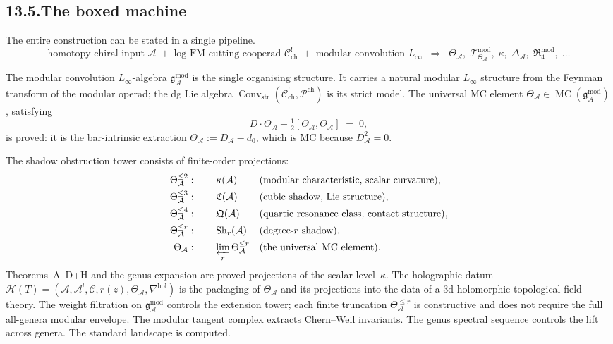 \documentclass[11pt]{report}
\theoremstyle{definition}
\theoremstyle{remark}
\providecommand{\cA}{\mathcal{A}}
\providecommand{\cC}{\mathcal{C}}
\numberwithin{equation}{section}
\begin{document}
\subsection*{13.5.\enspace The boxed machine}

The entire construction can be stated in a single pipeline.
\[
\boxed{
\text{homotopy chiral input }\cA
\;+\;
\text{log-FM cutting cooperad }\mathcal C^!_{\mathrm{ch}}
\;+\;
\text{modular convolution }L_\infty
\;\;\Longrightarrow\;\;
\Theta_\cA,\;
\mathcal T^{\mathrm{mod}}_{\Theta_\cA},\;
\kappa,\;
\Delta_\cA,\;
\mathfrak R^{\mathrm{mod}}_4,\;\ldots
}
\]

\bigskip
\noindent
The modular convolution $L_\infty$-algebra
$\mathfrak g^{\mathrm{mod}}_\cA$ is the single organising structure.
It carries a natural modular $L_\infty$ structure from the Feynman
transform of the modular operad; the dg Lie algebra
$\operatorname{Conv}_{\mathrm{str}}(\mathcal C^!_{\mathrm{ch}},
\mathcal P^{\mathrm{ch}})$ is its strict model. The universal MC
element
$\Theta_\cA\in\operatorname{MC}(\mathfrak g^{\mathrm{mod}}_\cA)$,
satisfying
\[
D\cdot\Theta_\cA+\tfrac12[\Theta_\cA,\Theta_\cA]\;=\;0,
\]
is proved: it is the bar-intrinsic extraction
$\Theta_\cA:=D_\cA-d_0$, which is MC because $D_\cA^2=0$.

The shadow obstruction tower consists of finite-order projections:
\begin{align*}
\Theta_\cA^{\le 2}&:\qquad\kappa(\cA)
 &&\text{(modular characteristic, scalar curvature)},\\
\Theta_\cA^{\le 3}&:\qquad\mathfrak C(\cA)
 &&\text{(cubic shadow, Lie structure)},\\
\Theta_\cA^{\le 4}&:\qquad\mathfrak Q(\cA)
 &&\text{(quartic resonance class, contact structure)},\\
\Theta_\cA^{\le r}&:\qquad\operatorname{Sh}_r(\cA)
 &&\text{(degree-$r$ shadow)},\\
\Theta_\cA&:\qquad\varprojlim_r\Theta_\cA^{\le r}
 &&\text{(the universal MC element)}.
\end{align*}
Theorems~A--D+H and the genus expansion are proved projections
of the scalar level~$\kappa$. The holographic datum
$\mathcal H(T)=(\cA,\cA^!,\cC,r(z),\Theta_\cA,\nabla^{\mathrm{hol}})$
is the packaging of $\Theta_\cA$ and its projections into
the data of a 3d holomorphic-topological field theory. The weight
filtration on $\mathfrak g^{\mathrm{mod}}_\cA$ controls the
extension tower; each finite truncation
$\Theta_\cA^{\le r}$ is constructive and does not require the
full all-genera modular envelope. The modular tangent complex
extracts Chern--Weil invariants. The genus spectral sequence
controls the lift across genera. The standard landscape is
computed.
\end{document}
